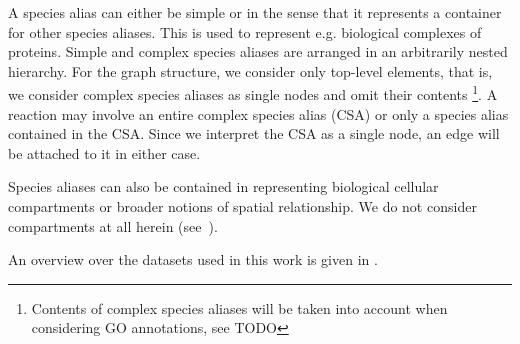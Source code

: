 \documentclass[
	fontsize=10pt, %
	twoside=false, %
	secnumdepth=1, %
  toc=indentunnumbered %
]{kaobook}
\begin{document}
A species alias can either be simple or  in the sense that it
represents a container for other species aliases. This is used to represent e.g.
biological complexes of proteins. Simple and complex species aliases are
arranged in an arbitrarily nested hierarchy. For the graph structure, we
consider only top-level elements, that is, we consider complex species aliases
as single nodes and omit their contents \footnote{ Contents of complex species
  aliases will be taken into account when considering GO annotations, see TODO
}. A reaction may involve an entire complex species alias (CSA) or only a
species alias contained in the CSA. Since we interpret the CSA as a single node,
an edge will be attached to it in either case.

Species aliases can also be contained in  representing
biological cellular compartments or broader notions of spatial relationship. We
do not consider compartments at all herein (see~).

An overview over the datasets used in this work is given in .


\end{document}
